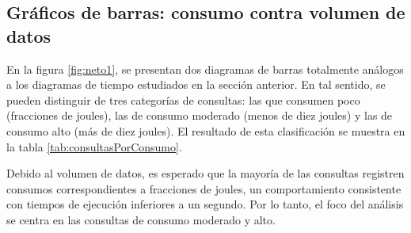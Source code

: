 \documentclass[12pt, letter paper]{report}
\begin{document}
      \subsection{Gráficos de barras: consumo contra volumen de datos} %
      \label{sub:gráficos_de_barras_consumo_contra_volumen_de_datos}
        En la figura \ref{fig:neto1}, se presentan dos diagramas de barras
        totalmente análogos a los diagramas de tiempo estudiados en la sección
        anterior. En tal sentido, se pueden distinguir de tres categorías de
        consultas: las que consumen poco (fracciones de joules), las de consumo
        moderado (menos de diez joules) y las de consumo alto (más de diez
        joules). El resultado de esta clasificación se muestra en la tabla
        \ref{tab:consultasPorConsumo}.

        Debido al volumen de datos, es esperado que la mayoría de las consultas
        registren consumos correspondientes a fracciones de joules, un
        comportamiento consistente con tiempos de ejecución inferiores a un
        segundo. Por lo tanto, el foco del análisis se centra en las consultas
        de consumo moderado y alto.
\end{document}
